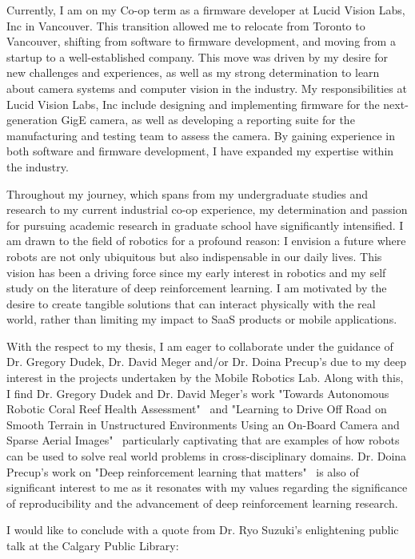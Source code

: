 \documentclass{article}
\begin{document}
Currently, I am on my Co-op term as a firmware developer at Lucid Vision Labs, Inc in Vancouver. 
This transition allowed me to relocate from Toronto to Vancouver, shifting from software to firmware development, 
and moving from a startup to a well-established company. This move was driven by my desire for new challenges and experiences, 
as well as my strong determination to learn about camera systems and computer vision in the industry. 
My responsibilities at Lucid Vision Labs, Inc include designing and implementing firmware for the next-generation GigE camera, 
as well as developing a reporting suite for the manufacturing and testing team to assess the camera. 
By gaining experience in both software and firmware development, I have expanded my expertise within the industry.


Throughout my journey, which spans from my undergraduate studies and research to my current 
industrial co-op experience, my determination and passion for pursuing academic research in graduate school 
have significantly intensified. I am drawn to the field of robotics for a profound reason: I envision a future 
where robots are not only ubiquitous but also indispensable in our daily lives. This vision has been a 
driving force since my early interest in robotics and my self study on the literature of deep reinforcement 
learning. I am motivated by the desire to create tangible 
solutions that can interact physically with the real world, rather than 
limiting my impact to SaaS products or mobile applications.


With the respect to my thesis, I am eager to collaborate under the guidance of 
Dr. Gregory Dudek, Dr. David Meger and/or Dr. Doina Precup's due to my deep interest in the projects undertaken by 
the Mobile Robotics Lab. Along with this, I find Dr. Gregory Dudek
and Dr. David Meger's work "Towards Autonomous Robotic Coral Reef Health Assessment"~\cite{manderson2016towards}
and "Learning to Drive Off Road on Smooth Terrain in Unstructured Environments Using an On-Board Camera and Sparse Aerial Images"~\cite{manderson2020learning}
particularly captivating that are examples of how robots can be used to solve real world problems in cross-disciplinary domains.
Dr. Doina Precup's work on "Deep reinforcement learning that matters"~\cite{henderson2018deep} is also of 
significant interest to me as it resonates with my values regarding the significance of reproducibility 
and the advancement of deep reinforcement learning research.

I would like to conclude with a quote from Dr. Ryo Suzuki's enlightening public talk at the Calgary Public Library:
\end{document}
